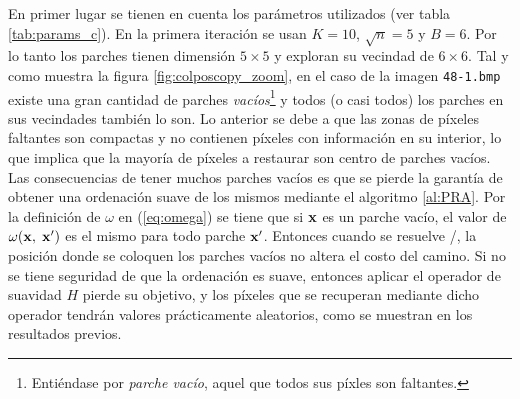  En primer lugar se tienen en cuenta los par\'ametros utilizados (ver tabla \ref{tab:params_c}). En la primera iteraci\'on se usan $K=10$, $\sqrt{n}=5$ y $B=6$. Por lo tanto los parches tienen dimensi\'on $5 \times 5$ y exploran su vecindad de $6 \times 6$. Tal y como muestra la figura \ref{fig:colposcopy_zoom}, en el caso de la imagen \texttt{48-1.bmp} existe una gran cantidad de parches \textit{vac\'ios}\footnote{Enti\'endase por \textit{parche vac\'io}, aquel que todos sus p\'ixles son faltantes.} y todos (o casi todos) los parches en sus vecindades tambi\'en lo son. Lo anterior se debe a que las zonas de p\'ixeles faltantes son compactas y no contienen p\'ixeles con informaci\'on en su interior, lo que implica que la mayor\'ia de p\'ixeles a restaurar son centro de parches vac\'ios. Las consecuencias de tener muchos parches vac\'ios es que se pierde la garant\'ia de obtener una ordenaci\'on suave de los mismos mediante el algoritmo \ref{al:PRA}. Por la definici\'on de $\omega$ en (\ref{eq:omega}) se tiene que si $\mathbf{x}$ es un parche vac\'io, el valor de $\omega(\mathbf{x},\; \mathbf{x}')$ es el mismo para todo parche $\mathbf{x}'$. Entonces cuando se resuelve \TSP/, la posici\'on donde se coloquen los parches vac\'ios no altera el costo del camino. Si no se tiene seguridad de que la ordenaci\'on es suave, entonces aplicar el operador de suavidad $H$ pierde su objetivo, y los p\'ixeles que se recuperan mediante dicho operador tendr\'an valores pr\'acticamente aleatorios, como se muestran en los resultados previos.
 
